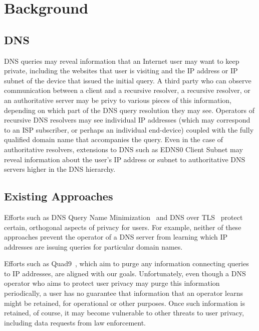\section{Background}

\subsection{DNS}

DNS queries may reveal information that an Internet user may want to keep private, including
the websites that user is visiting and the IP address or IP subnet of the device that issued 
the initial query.  A third party who can observe communication between a client and a 
recursive resolver, a recursive resolver, or an authoritative server may be privy to various 
pieces of this information, depending on which part of the DNS query resolution they may see. 
Operators of recursive DNS resolvers may see individual IP addresses (which may correspond to 
an ISP subscriber, or perhaps an individual end-device) coupled with the fully qualified domain 
name that accompanies the query. Even in the case of authoritative resolvers, extensions to DNS 
such as EDNS0 Client Subnet may reveal information about the user’s IP address or subnet to 
authoritative DNS servers higher in the DNS hierarchy.

\subsection{Existing Approaches}

Efforts such as DNS Query Name Minimization~\cite{dns_qname} and DNS over TLS~\cite{dns_tls} protect 
certain, orthogonal aspects of privacy for users. For example, neither of these approaches prevent 
the operator of a DNS server from learning which IP addresses are issuing queries for particular domain 
names. 

Efforts such as Quad9~\cite{quad9}, which aim to purge any information connecting 
queries to IP addresses, are aligned with our goals. Unfortunately, even 
though a DNS operator who aims to protect user privacy may purge this 
information periodically, a user has no guarantee that information that an 
operator learns might be retained, for operational or other purposes. Once 
such information is retained, of course, it may become vulnerable to other 
threats to user privacy, including data requests from law enforcement. 
